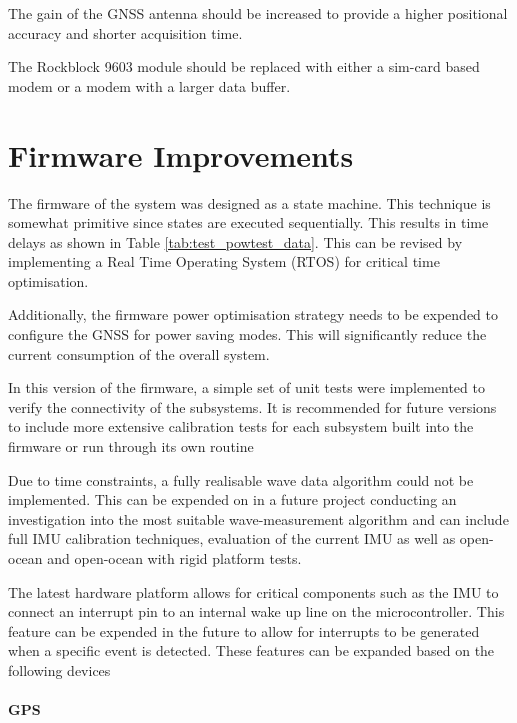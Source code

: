 The gain of the GNSS antenna should be increased to provide a higher positional accuracy and shorter acquisition time.

The Rockblock 9603 module should be replaced with either a sim-card based modem or a modem with a larger data buffer.
\section{Firmware Improvements}

The firmware of the system was designed as a state machine. This technique is somewhat primitive since states are executed sequentially. This results in time delays as shown in Table \ref{tab:test_powtest_data}. This can be revised by implementing a Real Time Operating System (RTOS) for critical time optimisation. \par 

Additionally, the firmware power optimisation strategy needs to be expended to configure the GNSS for power saving modes. This will significantly reduce the current consumption of the overall system.\par 

In this version of the firmware, a simple set of unit tests were implemented to verify the connectivity of the subsystems. It is recommended for future versions to include more extensive calibration tests for each subsystem built into the firmware or run through its own routine \par 

Due to time constraints, a fully realisable wave data algorithm could not be implemented. This can be expended on in a future project conducting an investigation into the most suitable wave-measurement algorithm and can include full IMU calibration techniques, evaluation of the current IMU as well as open-ocean and open-ocean with rigid platform tests. \par 

The latest hardware platform allows for critical components such as the IMU to connect an interrupt pin to an internal wake up line on the microcontroller. This feature can be expended in the future to allow for interrupts to be generated when a specific event is detected. These features can be expanded based on the following devices

\paragraph{GPS}

